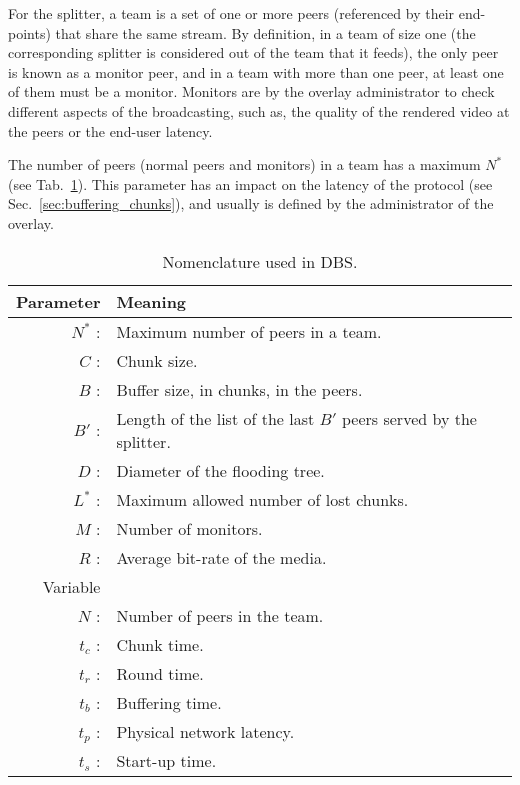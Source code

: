 

\label{sec:team_def}

For the splitter, a team is a set of one or more peers (referenced by
their end-points) that share the same stream. By definition, in a team
of size one (the corresponding splitter is considered out of the team
that it feeds), the only peer is known as a \gls{monitor} peer, and in
a team with more than one peer, at least one of them must be a
monitor. Monitors are  by the overlay administrator to
check different aspects of the broadcasting, such as, the quality of
the rendered video at the peers or the end-user latency.

The number of peers (normal peers and monitors) in a team has a
maximum $N^*$ (see Tab.~\ref{tab:DBS_nomenclature}). This parameter
has an impact on the latency of the protocol (see
Sec.~\ref{sec:buffering_chunks}), and usually is defined by the
administrator of the overlay.

\begin{table}[hbt]
  \centering
  \begin{tabular}{rl}
    Parameter & Meaning \\
    \hline
    $N^*$ :  & Maximum number of peers in a team. \\
    $C$ :    & Chunk size. \\
    $B$ :    & Buffer size, in chunks, in the peers. \\
    $B'$ :   & Length of the list of the last $B'$ peers served by the splitter. \\ 
    $D$ :    & Diameter of the flooding tree. \\
    $L^*$ :  & Maximum allowed number of lost chunks. \\
    $M$ :    & Number of monitors. \\
    $R$ :    & Average bit-rate of the media. \\
    Variable & \\
    \hline
    $N$ :    & Number of peers in the team. \\
    $t_c$ :  & Chunk time. \\
    $t_r$ :  & Round time. \\
    $t_b$ :  & Buffering time. \\
    $t_p$ :  & Physical network latency. \\
    $t_s$ :  & Start-up time.
  \end{tabular}
  \caption{Nomenclature used in DBS.} %
  \label{tab:DBS_nomenclature}
\end{table}

